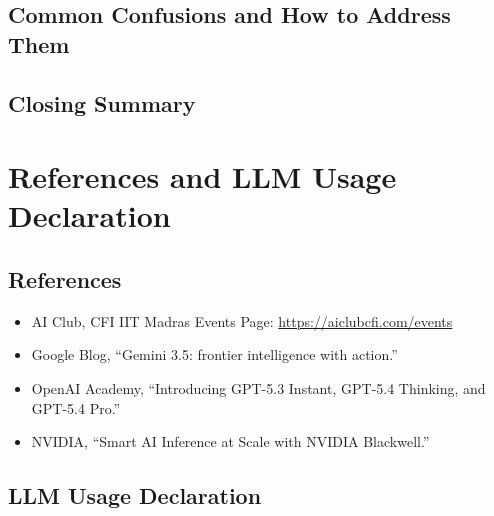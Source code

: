 \documentclass[11pt,a4paper]{article}
\newcommand{\answergap}{\vspace{0.9em}}
\begin{document}
\subsection{Common Confusions and How to Address Them}
\answergap

\subsection{Closing Summary}
\answergap

\section*{References and LLM Usage Declaration}

\subsection*{References}
\begin{itemize}
    \item AI Club, CFI IIT Madras Events Page: \url{https://aiclubcfi.com/events}
    \item Google Blog, ``Gemini 3.5: frontier intelligence with action.''
    \item OpenAI Academy, ``Introducing GPT-5.3 Instant, GPT-5.4 Thinking, and GPT-5.4 Pro.''
    \item NVIDIA, ``Smart AI Inference at Scale with NVIDIA Blackwell.''
\end{itemize}

\subsection*{LLM Usage Declaration}
\answergap
\end{document}
